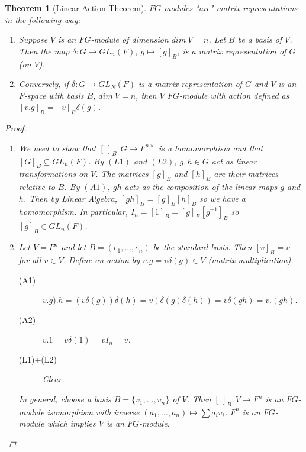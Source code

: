 \documentclass[12pt]{amsart}
\newtheorem{theorem}{Theorem}[section]
\theoremstyle{definition}
\begin{document}
\begin{theorem}[Linear Action Theorem]
$FG$-modules "are" matrix representations in the following way:
\begin{enumerate}
\item Suppose $V$ is an $FG$-module of dimension $dim\ V=n$.  Let $B$ be a basis of $V$.  Then the map $\delta:G\rightarrow GL_n(F),\ g\mapsto [g]_B$, is a matrix representation of $G$ (on $V$).
\item Conversely, if $\delta:G\rightarrow GL_N(F)$ is a matrix representation of $G$ and $V$ is an $F$-space with basis $B$, $dim\ V=n$, then $V$ $FG$-module with action defined as $[v.g]_B=[v]_B\delta(g)$.
\end{enumerate}

\begin{proof}
\begin{enumerate}
\item We need to show that $[\ ]_B:G\rightarrow F^{n\times}$ is a homomorphism and that $[G]_B\subseteq GL_n(F)$.  By $(L1)$ and $(L2)$, $g,h\in G$ act as linear transformations on $V$.  The matrices $[g]_B$ and $[h]_B$ are their matrices relative to $B$.  By $(A1)$, $gh$ acts as the composition of the linear maps $g$ and $h$.  Then by Linear Algebra, $[gh]_B=[g]_B[h]_B$ so we have a homomorphism.  In particular, $I_n=[1]_B=[g]_B[g^{-1}]_B$ so $[g]_B\in GL_n(F)$.
\item Let $V=F^n$ and let $B=(e_1,\ldots,e_n)$ be the standard basis.  Then $[v]_B=v$ for all $v\in V$.  Define an action by $v.g=v\delta(g)\in V$ (matrix multiplication).
    \begin{description}
    \item[(A1)] $v.g).h=(v\delta(g))\delta(h)=v(\delta(g)\delta(h))=v\delta(gh)=v.(gh)$.
    \item[(A2)] $v.1=v\delta(1)=vI_n=v$.
    \item[(L1)+(L2)] Clear.
    \end{description}
    In general, choose a basis $B=\{v_1,\ldots,v_n\}$ of $V$.  Then $[\ ]_B:V\rightarrow F^n$ is an $FG$-module isomorphism with inverse $(a_1,\ldots,a_n)\mapsto\sum a_i v_i$.  $F^n$ is an $FG$-module which implies $V$ is an $FG$-module.
\end{enumerate}
\end{proof}
\end{theorem}
\end{document}
